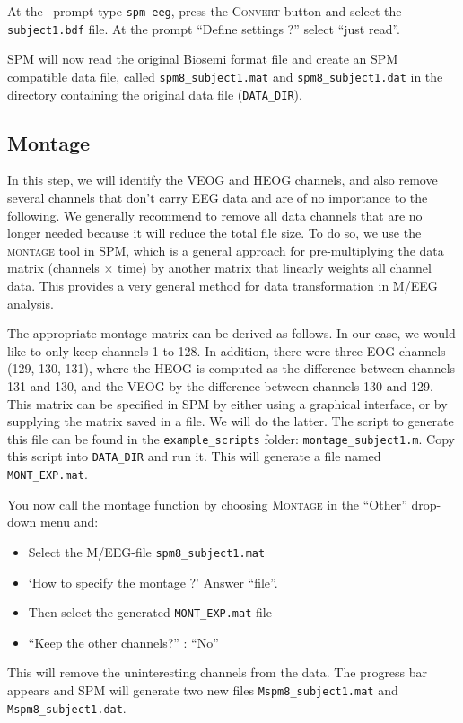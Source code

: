 At the \matlab\ prompt type \texttt{spm eeg}, press the \textsc{Convert} button and select the \texttt{subject1.bdf} file. At the prompt ``Define settings ?'' select ``just read''.

SPM will now read the original Biosemi format file and create an SPM compatible data file, called \texttt{spm8\_subject1.mat} and \texttt{spm8\_subject1.dat} in the directory containing the original data file (\texttt{DATA\_DIR}).

\subsection{Montage}

In this step, we will identify the VEOG and HEOG channels, and also remove several channels that don't carry EEG data and are of no importance to the following. We generally recommend to remove all data channels that are no longer needed because it will reduce the total file size. To do so, we use the \textsc{montage} tool in SPM, which is a general approach for pre-multiplying the data matrix (channels $\times$ time) by another matrix that linearly weights all channel data. This provides a very general method for data transformation in M/EEG analysis.

The appropriate montage-matrix can be derived as follows.
In our case, we would like to only keep channels 1 to 128. In addition, there were three EOG channels (129, 130, 131), where the HEOG is computed as the difference between channels 131 and 130, and the VEOG by the difference between channels 130 and 129. This matrix can be specified in SPM by either using a graphical interface, or by supplying the matrix saved in a file. We will do the latter. The script to generate this file can be found in the \texttt{example\_scripts} folder: \texttt{montage\_subject1.m}. Copy this script into \texttt{DATA\_DIR} and run it. This will generate a file named \texttt{MONT\_EXP.mat}.

You now call the montage function by choosing \textsc{Montage} in the ``Other'' drop-down menu and:
\begin{itemize}
\item{Select the M/EEG-file \texttt{spm8\_subject1.mat}}
\item{`How to specify the montage ?' Answer ``file''.}
\item{Then select the generated \texttt{MONT\_EXP.mat} file}
\item{``Keep the other channels?'' : ``No''}
\end{itemize}
This will remove the uninteresting channels from the data. The progress bar appears and SPM will generate two new files \texttt{Mspm8\_subject1.mat} and \texttt{Mspm8\_subject1.dat}.

